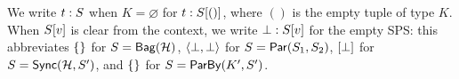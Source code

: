 




We write $t: \ss$ when $K = \varnothing$ for $t: \spstype{()}{\ss}$, where $()$ is the empty tuple of type $K$.
When $\spstype{v}{\ss}$ is clear from the context,
we write $\spsemp: \spstype{v}{\ss}$ for the empty SPS:
this abbreviates $\spsbag{}$ for $\ss = \relleaf{\mathcal{H}}$,
$\spspar{\spsemp}{\spsemp}$ for $\ss = \parcomp{S_1}{S_2}$,
$\spsseq{\bot}$ for $\ss = \hier{\mathcal{H}}{S'}$,
and $\spsbag{}$ for $\ss = \keyby{K'}{S'}$.

